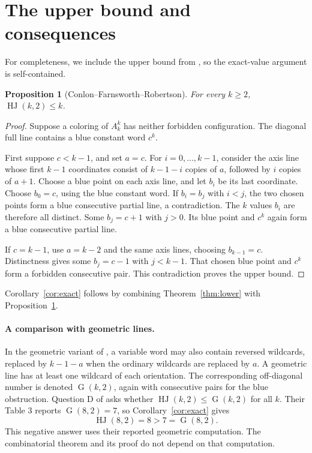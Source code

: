 \documentclass[11pt]{amsart}
\newtheorem{proposition}[theorem]{Proposition}
\newcommand{\HJ}{\operatorname{HJ}}
\newcommand{\GG}{\operatorname{G}}
\begin{document}
\section{The upper bound and consequences}

For completeness, we include the upper bound from \cite[Theorem 12]{CFR}, so the exact-value argument is self-contained.

\begin{proposition}[Conlon--Farnsworth--Robertson]\label{prop:upper}
For every $k\ge2$, $\HJ(k,2)\le k$.
\end{proposition}
\begin{proof}
Suppose a coloring of $A_k^k$ has neither forbidden configuration. The diagonal full line contains a blue constant word $c^k$.

First suppose $c<k-1$, and set $a=c$. For $i=0,\ldots,k-1$, consider the axis line whose first $k-1$ coordinates consist of $k-1-i$ copies of $a$, followed by $i$ copies of $a+1$. Choose a blue point on each axis line, and let $b_i$ be its last coordinate. Choose $b_0=c$, using the blue constant word. If $b_i=b_j$ with $i<j$, the two chosen points form a blue consecutive partial line, a contradiction. The $k$ values $b_i$ are therefore all distinct. Some $b_j=c+1$ with $j>0$. Its blue point and $c^k$ again form a blue consecutive partial line.

If $c=k-1$, use $a=k-2$ and the same axis lines, choosing $b_{k-1}=c$. Distinctness gives some $b_j=c-1$ with $j<k-1$. That chosen blue point and $c^k$ form a forbidden consecutive pair. This contradiction proves the upper bound.
\end{proof}

Corollary~\ref{cor:exact} follows by combining Theorem~\ref{thm:lower} with Proposition~\ref{prop:upper}.

\paragraph{A comparison with geometric lines.}
In the geometric variant of \cite{CFR}, a variable word may also contain reversed wildcards, replaced by $k-1-a$ when the ordinary wildcards are replaced by $a$. A geometric line has at least one wildcard of each orientation. The corresponding off-diagonal number is denoted $\GG(k,2)$, again with consecutive pairs for the blue obstruction. Question D of \cite{CFR} asks whether $\HJ(k,2)\le\GG(k,2)$ for all $k$. Their Table 3 reports $\GG(8,2)=7$, so Corollary~\ref{cor:exact} gives
\[
\HJ(8,2)=8>7=\GG(8,2).
\]
This negative answer uses their reported geometric computation. The combinatorial theorem and its proof do not depend on that computation.
\end{document}
